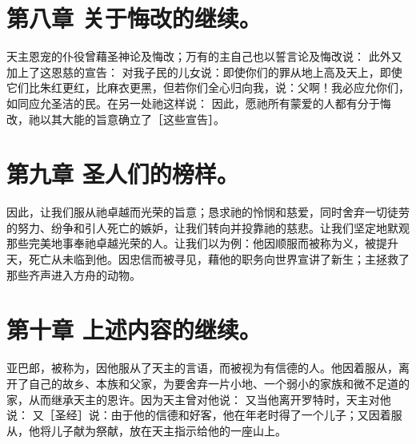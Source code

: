 \section{第八章 关于悔改的继续。}

天主恩宠的仆役曾藉圣神论及悔改；万有的主自己也以誓言论及悔改说：  此外又加上了这恩慈的宣告：  对我子民的儿女说：即使你们的罪从地上高及天上，即使它们比朱红更红，比麻衣更黑，但若你们全心归向我，说：父啊！我必应允你们，如同应允圣洁的民。在另一处祂这样说：  因此，愿祂所有蒙爱的人都有分于悔改，祂以其大能的旨意确立了［这些宣告］。\par


\section{第九章 圣人们的榜样。}

因此，让我们服从祂卓越而光荣的旨意；恳求祂的怜悯和慈爱，同时舍弃一切徒劳的努力、纷争和引人死亡的嫉妒，让我们转向并投靠祂的慈悲。让我们坚定地默观那些完美地事奉祂卓越光荣的人。让我们以为例：他因顺服而被称为义，被提升天，死亡从未临到他。因忠信而被寻见，藉他的职务向世界宣讲了新生；主拯救了那些齐声进入方舟的动物。\par


\section{第十章 上述内容的继续。}

亚巴郎，被称为，因他服从了天主的言语，而被视为有信德的人。他因着服从，离开了自己的故乡、本族和父家，为要舍弃一片小地、一个弱小的家族和微不足道的家，从而继承天主的恩许。因为天主曾对他说： 又当他离开罗特时，天主对他说： 又［圣经］说：由于他的信德和好客，他在年老时得了一个儿子；又因着服从，他将儿子献为祭献，放在天主指示给他的一座山上。\par

